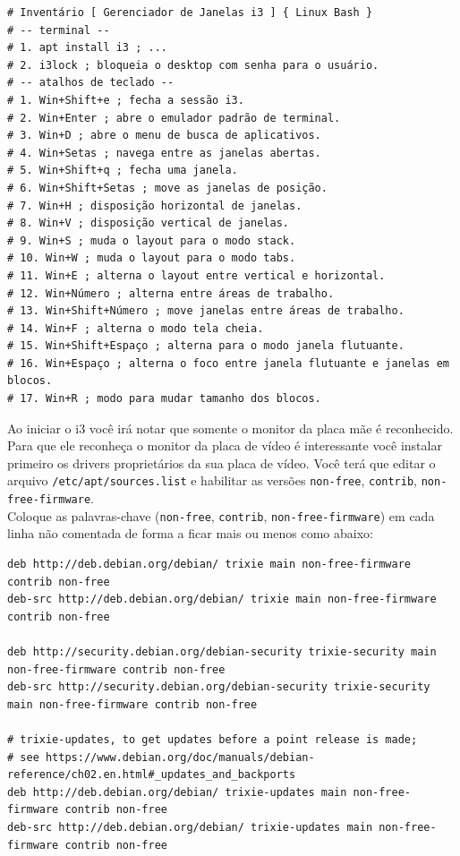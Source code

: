 \documentclass[12pt,a4paper]{article}
\begin{document}
\begin{lstlisting}
# Inventário [ Gerenciador de Janelas i3 ] { Linux Bash }
# -- terminal -- 
# 1. apt install i3 ; ...
# 2. i3lock ; bloqueia o desktop com senha para o usuário.
# -- atalhos de teclado -- 
# 1. Win+Shift+e ; fecha a sessão i3.
# 2. Win+Enter ; abre o emulador padrão de terminal.
# 3. Win+D ; abre o menu de busca de aplicativos.
# 4. Win+Setas ; navega entre as janelas abertas.
# 5. Win+Shift+q ; fecha uma janela.
# 6. Win+Shift+Setas ; move as janelas de posição.
# 7. Win+H ; disposição horizontal de janelas.
# 8. Win+V ; disposição vertical de janelas.
# 9. Win+S ; muda o layout para o modo stack.
# 10. Win+W ; muda o layout para o modo tabs.
# 11. Win+E ; alterna o layout entre vertical e horizontal.
# 12. Win+Número ; alterna entre áreas de trabalho.
# 13. Win+Shift+Número ; move janelas entre áreas de trabalho. 
# 14. Win+F ; alterna o modo tela cheia.
# 15. Win+Shift+Espaço ; alterna para o modo janela flutuante.
# 16. Win+Espaço ; alterna o foco entre janela flutuante e janelas em blocos.
# 17. Win+R ; modo para mudar tamanho dos blocos.
\end{lstlisting}

\vspace{\baselineskip}

Ao iniciar o i3 você irá notar que somente o monitor da placa mãe é reconhecido. Para que ele reconheça o monitor da placa de vídeo é interessante você instalar primeiro os drivers proprietários da sua placa de vídeo. Você terá que editar o arquivo \texttt{/etc/apt/sources.list} e habilitar as versões \texttt{non-free}, \texttt{contrib}, \texttt{non-free-firmware}. \\

Coloque as palavras-chave (\texttt{non-free}, \texttt{contrib}, \texttt{non-free-firmware}) em cada linha não comentada de forma a ficar mais ou menos como abaixo:\\

\begin{lstlisting}
deb http://deb.debian.org/debian/ trixie main non-free-firmware contrib non-free
deb-src http://deb.debian.org/debian/ trixie main non-free-firmware contrib non-free

deb http://security.debian.org/debian-security trixie-security main non-free-firmware contrib non-free
deb-src http://security.debian.org/debian-security trixie-security main non-free-firmware contrib non-free

# trixie-updates, to get updates before a point release is made;
# see https://www.debian.org/doc/manuals/debian-reference/ch02.en.html#_updates_and_backports
deb http://deb.debian.org/debian/ trixie-updates main non-free-firmware contrib non-free
deb-src http://deb.debian.org/debian/ trixie-updates main non-free-firmware contrib non-free
\end{lstlisting}
\end{document}
